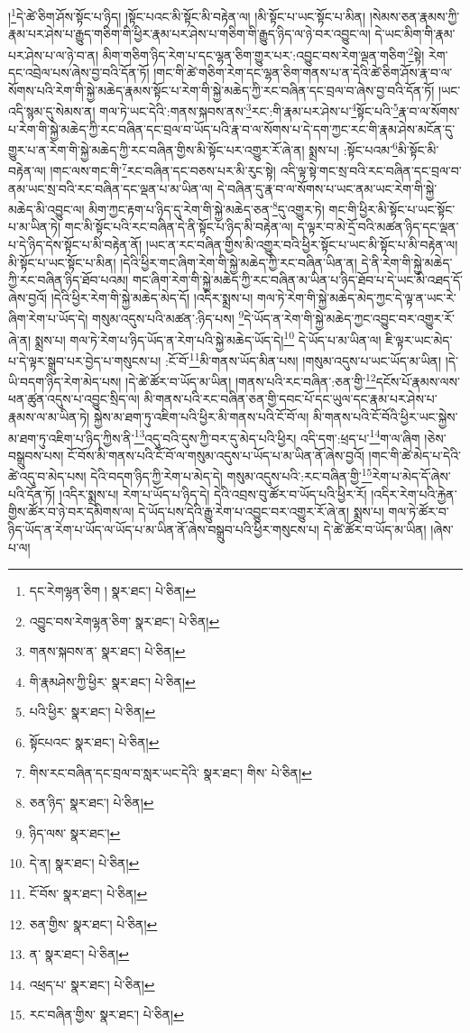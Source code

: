 །\footnote{དང་རེགལྷན་ཅིག །  སྣར་ཐང་།  པེ་ཅིན། }དེ་ཚེ་ཅིག་ཤོས་སྟོང་པ་ཉིད། །སྟོང་པའང་མི་སྟོང་མི་བརྟེན་ལ། །མི་སྟོང་པ་ཡང་སྟོང་པ་མིན། །སེམས་ཅན་རྣམས་ཀྱི་རྣམ་པར་ཤེས་པ་རྒྱུད་གཅིག་གི་ཕྱིར་རྣམ་པར་ཤེས་པ་གཅིག་གི་རྒྱུད་ཉིད་ལ་ཉེ་བར་འབྱུང་ལ། དེ་ཡང་མིག་གི་རྣམ་པར་ཤེས་པ་ལ་ཉེ་བ་ན། མིག་གཅིག་ཉིད་རེག་པ་དང་ལྷན་ཅིག་གྱུར་པར་:འབྱུང་བས་རེག་ལྡན་གཅིག་\footnote{འབྱུང་བས་རེགལྷན་ཅིག་  སྣར་ཐང་།  པེ་ཅིན། }སྟེ། རེག་དང་འབྲེལ་པས་ཞེས་བྱ་བའི་དོན་ཏོ། །གང་གི་ཚེ་གཅིག་རེག་དང་ལྷན་ཅིག་གནས་པ་ན་དེའི་ཚེ་ཅིག་ཤོས་རྣ་བ་ལ་སོགས་པའི་རེག་གི་སྐྱེ་མཆེད་རྣམས་སྟོང་པ་རེག་གི་སྐྱེ་མཆེད་ཀྱི་རང་བཞིན་དང་བྲལ་བ་ཞེས་བྱ་བའི་དོན་ཏོ། །ཡང་འདི་སྙམ་དུ་སེམས་ན། གལ་ཏེ་ཡང་དེའི་:གནས་སྐབས་ནས་\footnote{གནས་སྐབས་ན་  སྣར་ཐང་།  པེ་ཅིན། }རང་:གི་རྣམ་པར་ཤེས་པ་\footnote{གི་རྣམཤེས་ཀྱི་ཕྱིར་  སྣར་ཐང་།  པེ་ཅིན། }སྟོང་པའི་\footnote{པའི་ཕྱིར་  སྣར་ཐང་།  པེ་ཅིན། }རྣ་བ་ལ་སོགས་པ་རེག་གི་སྐྱེ་མཆེད་ཀྱི་རང་བཞིན་དང་བྲལ་བ་ཡོད་པའི་རྣ་བ་ལ་སོགས་པ་དེ་དག་ཀྱང་རང་གི་རྣམ་ཤེས་མངོན་དུ་གྱུར་པ་ན་རེག་གི་སྐྱེ་མཆེད་ཀྱི་རང་བཞིན་གྱིས་མི་སྟོང་པར་འགྱུར་རོ་ཞེ་ན། སྨྲས་པ། :སྟོང་པའམ་\footnote{སྟོངཔའང་  སྣར་ཐང་།  པེ་ཅིན། }མི་སྟོང་མི་བརྟེན་ལ། །གང་ལས་གང་གི་\footnote{གིས་རང་བཞིན་དང་བྲལ་བ་སླར་ཡང་དེའི་  སྣར་ཐང་། གིས་  པེ་ཅིན། }རང་བཞིན་དང་བཅས་པར་མི་རུང་སྟེ། འདི་ལྟ་སྟེ་གང་སྲ་བའི་རང་བཞིན་དང་བྲལ་བ་ནམ་ཡང་སྲ་བའི་རང་བཞིན་དང་ལྡན་པ་མ་ཡིན་ལ། དེ་བཞིན་དུ་རྣ་བ་ལ་སོགས་པ་ཡང་ནམ་ཡང་རེག་གི་སྐྱེ་མཆེད་མི་འབྱུང་ལ། མིག་ཀྱང་རྟག་པ་ཉིད་དུ་རེག་གི་སྐྱེ་མཆེད་ཅན་\footnote{ཅན་ཉིད་  སྣར་ཐང་།  པེ་ཅིན། }དུ་འགྱུར་ཏེ། གང་གི་ཕྱིར་མི་སྟོང་པ་ཡང་སྟོང་པ་མ་ཡིན་ཏེ། གང་མི་སྟོང་པའི་རང་བཞིན་དེ་ནི་སྟོང་པ་ཉིད་མི་བརྟེན་ལ། ད་ལྟར་བ་མེ་དྲོ་བའི་མཚན་ཉིད་དང་ལྡན་པ་དེ་ཉིད་དེས་སྟོང་པ་མི་བརྟེན་ནོ། །ཡང་ན་རང་བཞིན་གྱིས་མི་འགྱུར་བའི་ཕྱིར་སྟོང་པ་ཡང་མི་སྟོང་པ་མི་བརྟེན་ལ། མི་སྟོང་པ་ཡང་སྟོང་པ་མིན། །དེའི་ཕྱིར་གང་ཞིག་རེག་གི་སྐྱེ་མཆེད་ཀྱི་རང་བཞིན་ཡིན་ན། དེ་ནི་རེག་གི་སྐྱེ་མཆེད་ཀྱི་རང་བཞིན་ཉིད་ཐོབ་པའམ། གང་ཞིག་རེག་གི་སྐྱེ་མཆེད་ཀྱི་རང་བཞིན་མ་ཡིན་པ་ཉིད་ཐོབ་པ་དེ་ཡང་མི་འཐད་དོ་ཞེས་བྱའོ། །དེའི་ཕྱིར་རེག་གི་སྐྱེ་མཆེད་མེད་དོ། །འདིར་སྨྲས་པ། གལ་ཏེ་རེག་གི་སྐྱེ་མཆེད་མེད་ཀྱང་དེ་ལྟ་ན་ཡང་རེ་ཞིག་རེག་པ་ཡོད་དེ། གསུམ་འདུས་པའི་མཚན་:ཉིད་པས། \footnote{ཉིད་ལས་  སྣར་ཐང་། }དེ་ཡོད་ན་རེག་གི་སྐྱེ་མཆེད་ཀྱང་འབྱུང་བར་འགྱུར་རོ་ཞེ་ན། སྨྲས་པ། གལ་ཏེ་རེག་པ་ཉིད་ཡོད་ན་རེག་པའི་སྐྱེ་མཆེད་ཡོད་དེ།\footnote{དེ་ན།  སྣར་ཐང་།  པེ་ཅིན། } དེ་ཡོད་པ་མ་ཡིན་ལ། ཇི་ལྟར་ཡང་མེད་པ་དེ་ལྟར་སྒྲུབ་པར་བྱེད་པ་གསུངས་པ། :ངོ་བོ་\footnote{ངོ་བོས་  སྣར་ཐང་།  པེ་ཅིན། }མི་གནས་ཡོད་མིན་པས། །གསུམ་འདུས་པ་ཡང་ཡོད་མ་ཡིན། །དེ་ཡི་བདག་ཉིད་རེག་མེད་པས། །དེ་ཚེ་ཚོར་བ་ཡོད་མ་ཡིན། །གནས་པའི་རང་བཞིན་:ཅན་གྱི་\footnote{ཅན་གྱིས་  སྣར་ཐང་།  པེ་ཅིན། }དངོས་པོ་རྣམས་ལས་ཕན་ཚུན་འདུས་པ་འབྱུང་སྲིད་ལ། མི་གནས་པའི་རང་བཞིན་ཅན་གྱི་དབང་པོ་དང་ཡུལ་དང་རྣམ་པར་ཤེས་པ་རྣམས་ལ་མ་ཡིན་ཏེ། སྐྱེས་མ་ཐག་ཏུ་འཇིག་པའི་ཕྱིར་མི་གནས་པའི་ངོ་བོ་ལ། མི་གནས་པའི་ངོ་བོའི་ཕྱིར་ཡང་སྐྱེས་མ་ཐག་ཏུ་འཇིག་པ་ཉིད་ཀྱིས་ནི་\footnote{ན་  སྣར་ཐང་།  པེ་ཅིན། }འདུ་བའི་དུས་ཀྱི་བར་དུ་མེད་པའི་ཕྱིར། འདི་དག་:ཕྲད་པ་\footnote{འཕྲད་པ་  སྣར་ཐང་།  པེ་ཅིན། }ག་ལ་ཞིག །ཅེས་བསྒྲུབས་པས། ངོ་བོས་མི་གནས་པའི་ངོ་བོ་ལ་གསུམ་འདུས་པ་ཡོད་པ་མ་ཡིན་ནོ་ཞེས་བྱའོ། །གང་གི་ཚེ་མེད་པ་དེའི་ཚེ་འདུ་བ་མེད་པས། དེའི་བདག་ཉིད་ཀྱི་རེག་པ་མེད་དེ། གསུམ་འདུས་པའི་:རང་བཞིན་གྱི་\footnote{རང་བཞིན་གྱིས་  སྣར་ཐང་།  པེ་ཅིན། }རེག་པ་མེད་དོ་ཞེས་པའི་དོན་ཏོ། །འདིར་སྨྲས་པ། རེག་པ་ཡོད་པ་ཉིད་དེ། དེའི་འབྲས་བུ་ཚོར་བ་ཡོད་པའི་ཕྱིར་རོ། །འདིར་རེག་པའི་རྐྱེན་གྱིས་ཚོར་བ་ཉེ་བར་དམིགས་ལ། དེ་ཡོད་པས་དེའི་རྒྱུ་རེག་པ་འབྱུང་བར་འགྱུར་རོ་ཞེ་ན། སྨྲས་པ། གལ་ཏེ་ཚོར་བ་ཉིད་ཡོད་ན་རེག་པ་ཡོད་ལ་ཡོད་པ་མ་ཡིན་ནོ་ཞེས་བསྒྲུབ་པའི་ཕྱིར་གསུངས་པ། དེ་ཚེ་ཚོར་བ་ཡོད་མ་ཡིན། །ཞེས་པ་ལ། 